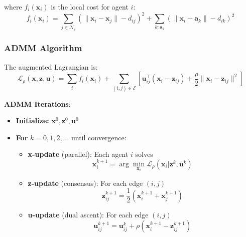 \documentclass[11pt,a4paper]{article}
\begin{document}
where $f_i(\mathbf{x}_i)$ is the local cost for agent $i$:
\begin{equation}
f_i(\mathbf{x}_i) = \sum_{j \in \mathcal{N}_i} \left(\|\mathbf{x}_i - \mathbf{x}_j\| - d_{ij}\right)^2 + \sum_{k : \mathbf{a}_k} \left(\|\mathbf{x}_i - \mathbf{a}_k\| - d_{ik}\right)^2
\end{equation}

\subsubsection{ADMM Algorithm}

The augmented Lagrangian is:
\begin{equation}
\mathcal{L}_\rho(\mathbf{x}, \mathbf{z}, \mathbf{u}) = \sum_i f_i(\mathbf{x}_i) + \sum_{(i,j) \in \mathcal{E}} \left[ \mathbf{u}_{ij}^\top(\mathbf{x}_i - \mathbf{z}_{ij}) + \frac{\rho}{2}\|\mathbf{x}_i - \mathbf{z}_{ij}\|^2 \right]
\end{equation}

\textbf{ADMM Iterations}:

\begin{itemize}
    \item[] \textbf{Initialize:} $\mathbf{x}^0, \mathbf{z}^0, \mathbf{u}^0$
    \item[] \textbf{For} $k = 0, 1, 2, \ldots$ until convergence:
    \begin{itemize}
        \item \textbf{x-update} (parallel): Each agent $i$ solves
        \begin{equation*}
        \mathbf{x}_i^{k+1} = \arg\min_{\mathbf{x}_i} \mathcal{L}_\rho(\mathbf{x}_i | \mathbf{z}^k, \mathbf{u}^k)
        \end{equation*}
        \item \textbf{z-update} (consensus): For each edge $(i,j)$
        \begin{equation*}
        \mathbf{z}_{ij}^{k+1} = \frac{1}{2}(\mathbf{x}_i^{k+1} + \mathbf{x}_j^{k+1})
        \end{equation*}
        \item \textbf{u-update} (dual ascent): For each edge $(i,j)$
        \begin{equation*}
        \mathbf{u}_{ij}^{k+1} = \mathbf{u}_{ij}^k + \rho(\mathbf{x}_i^{k+1} - \mathbf{z}_{ij}^{k+1})
        \end{equation*}
    \end{itemize}
\end{itemize}
\end{document}
